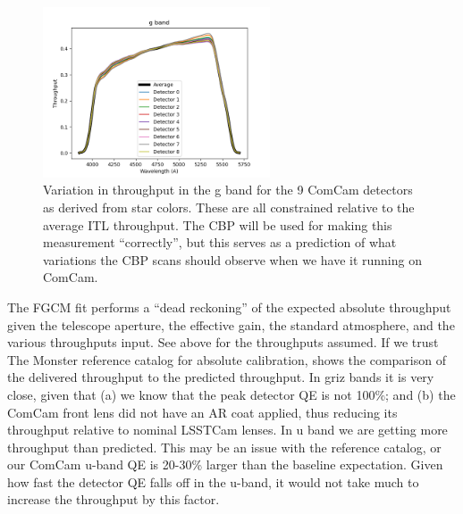 \begin{figure}
  \begin{center}
    \includegraphics[width=0.6\textwidth]{photometric_calibration_figures/detector_chromaticity_g.png}
  \end{center}
  \caption{Variation in throughput in the g band for the 9 ComCam detectors as
    derived from star colors. These are all constrained relative to the average
    ITL throughput. The CBP will be used for making this measurement
    ``correctly'', but this serves as a prediction of what variations the CBP
    scans should observe when we have it running on ComCam.}
\end{figure}

\label{sec:absolutethroughputs}

The FGCM fit performs a ``dead reckoning'' of the expected absolute throughput
given the telescope aperture, the effective gain, the standard atmosphere, and
the various throughputs input.  See above for the throughputs assumed.  If we
trust The Monster reference catalog for absolute calibration,
 shows the comparison of the delivered
throughput to the predicted throughput.  In griz bands it is very close, given
that (a) we know that the peak detector QE is not 100\%; and (b) the ComCam
front lens did not have an AR coat applied, thus reducing its throughput
relative to nominal LSSTCam lenses.  In u band we are getting more throughput
than predicted.  This may be an issue with the reference catalog, or our ComCam
u-band QE is 20-30\% larger than the baseline expectation.  Given how fast the
detector QE falls off in the u-band, it would not take much to increase the
throughput by this factor.

